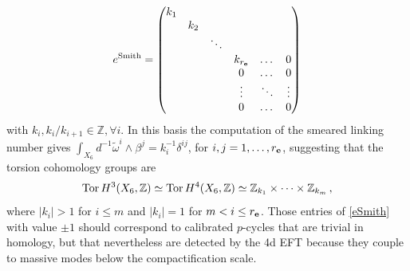 \documentclass[11pt]{article}
\def\be{\begin{equation}}
\def\ee{\end{equation}}
\def\om{\omega}
\newcommand{\IZ}{\mathbb{Z}}
\begin{document}
\be
e^{\rm Smith} =
\begin{pmatrix}
k_1 \\ & k_2 \\ & & \ddots \\& & & k_{r_{\bf e}} & \dots & 0\\ & & & 0 &\dots & 0 \\  & & & \vdots &\ddots & \vdots \\ & & & 0 &\dots & 0
\end{pmatrix}
\label{eSmith}
\ee
with $k_i, k_i/k_{i+1} \in \IZ, \forall i$. In this basis the computation of the smeared linking number gives $\int_{X_6} d^{-1} \tilde{\om}^i \wedge \beta^j = k_{i}^{-1} \delta^{ij}$, for $i,j = 1, \dots, r_{\bf e}$, suggesting that the torsion cohomology groups are
\be
{\rm Tor }\, H^3(X_6, \IZ) \simeq {\rm Tor }\, H^4(X_6, \IZ) \simeq \IZ_{k_1} \times \dots \times \IZ_{k_m}\, ,
\label{torsmith}
\ee
where $|k_i| > 1$ for $i \leq m$ and $|k_i| = 1$ for $m< i \leq r_{\bf e}$. Those entries of \eqref{eSmith} with value $\pm1$ should correspond to calibrated $p$-cycles that are trivial in homology, but that nevertheless are detected by the 4d EFT because they couple to massive modes below the compactification scale.
\end{document}
